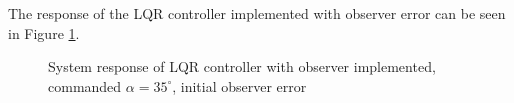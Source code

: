 \documentclass[]{aiaa-tc}%
\begin{document}
	\vspace{5 mm}

	The response of the LQR controller implemented with observer error can be seen in Figure \ref{fig:ControllerLQRErr}.

	\begin{figure}[H]
		\centering
		\caption{System response of LQR controller with observer implemented, commanded $\alpha=35^{\circ}$, initial observer error }
		\label{fig:ControllerLQRErr}
	\end{figure}	
\end{document}
